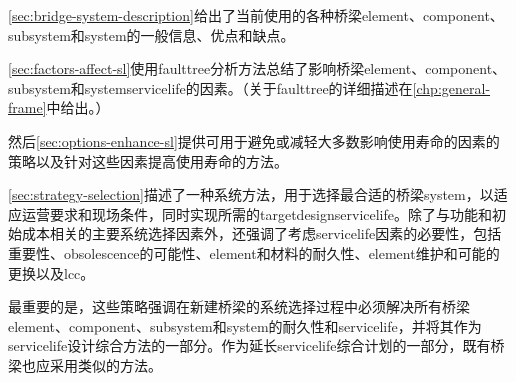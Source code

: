 \cref{sec:bridge-system-description}给出了当前使用的各种桥梁\gls*{element}、\gls*{component}、\gls*{subsystem}和\gls*{system}的一般信息、优点和缺点。

\cref{sec:factors-affect-sl}使用\gls*{faulttree}分析方法总结了影响桥梁\gls*{element}、\gls*{component}、\gls*{subsystem}和\gls*{system}\gls*{servicelife}的因素。（关于\gls*{faulttree}的详细描述在\cref{chp:general-frame}中给出。）

然后\cref{sec:options-enhance-sl}提供可用于避免或减轻大多数影响使用寿命的因素的策略以及针对这些因素提高使用寿命的方法。

\cref{sec:strategy-selection}描述了一种系统方法，用于选择最合适的桥梁\gls*{system}，以适应运营要求和现场条件，同时实现所需的\gls*{targetdesignservicelife}。除了与功能和初始成本相关的主要系统选择因素外，还强调了考虑\gls*{servicelife}因素的必要性，包括重要性、\gls{obsolescence}的可能性、\gls*{element}和材料的耐久性、\gls*{element}维护和可能的更换以及\acrlong*{lcc}。


最重要的是，这些策略强调在新建桥梁的系统选择过程中必须解决所有桥梁\gls*{element}、\gls*{component}、\gls*{subsystem}和\gls*{system}的耐久性和\gls*{servicelife}，并将其作为\gls*{servicelife}设计综合方法的一部分。作为延长\gls*{servicelife}综合计划的一部分，既有桥梁也应采用类似的方法。


